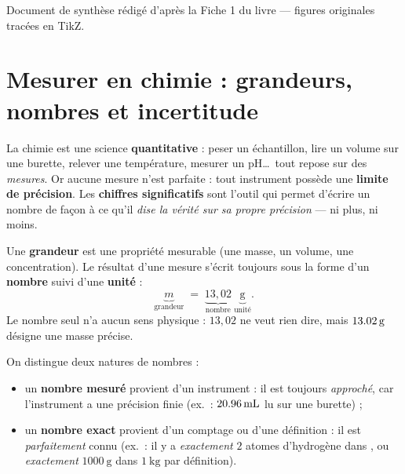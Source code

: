 \documentclass[11pt,a4paper]{article}
\newcommand{\CS}{chiffres significatifs}
\begin{document}
\vspace{0.6cm}
{\small\color{black!60} Document de synthèse rédigé d'après la Fiche 1 du livre — figures originales tracées en TikZ.}
\par
\endgroup

\newpage
\renewcommand{\contentsname}{\textcolor{primarydark}{Table des matières}}
\tableofcontents
\thispagestyle{fancy}
\newpage

\section{Mesurer en chimie : grandeurs, nombres et incertitude}
La chimie est une science \textbf{quantitative} : peser un échantillon, lire un volume sur une
burette, relever une température, mesurer un pH\dots\ tout repose sur des \emph{mesures}. Or aucune
mesure n'est parfaite : tout instrument possède une \textbf{limite de précision}. Les
\textbf{\CS} sont l'outil qui permet d'écrire un nombre de façon à ce qu'il \emph{dise la vérité sur
sa propre précision} — ni plus, ni moins.

\begin{definition}
Une \textbf{grandeur} est une propriété mesurable (une masse, un volume, une concentration). Le
résultat d'une mesure s'écrit toujours sous la forme d'un \textbf{nombre} suivi d'une \textbf{unité} :
\[ \underbrace{m}_{\text{grandeur}} \;=\; \underbrace{13{,}02}_{\text{nombre}}\ \underbrace{\si{\gram}}_{\text{unité}}. \]
Le nombre seul n'a aucun sens physique : \og $13{,}02$\fg{} ne veut rien dire, mais
\og $\qty{13{,}02}{\gram}$\fg{} désigne une masse précise.
\end{definition}

\begin{definition}
On distingue deux natures de nombres :
\begin{itemize}[leftmargin=1.6em,topsep=2pt,itemsep=1.5pt]
  \item un \textbf{nombre mesuré} provient d'un instrument : il est toujours \emph{approché}, car
        l'instrument a une précision finie (ex.\ : $\qty{20{,}96}{\milli\litre}$ lu sur une burette) ;
  \item un \textbf{nombre exact} provient d'un comptage ou d'une définition : il est \emph{parfaitement}
        connu (ex.\ : il y a \emph{exactement} $2$ atomes d'hydrogène dans , ou
        \emph{exactement} $\qty{1000}{\gram}$ dans $\qty{1}{\kilo\gram}$ par définition).
\end{itemize}
\end{definition}
\end{document}
